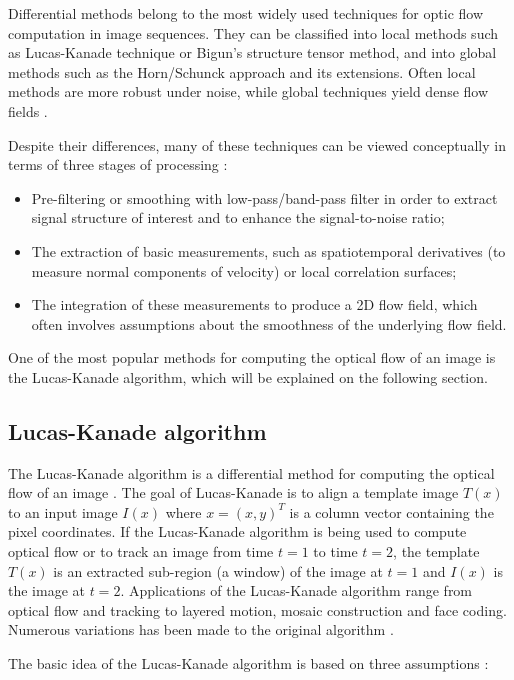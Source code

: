 \documentclass[msc, a4paper, classic, en]{ufbathesis}
\begin{document}
Differential methods belong to the most widely used techniques for optic flow computation in image sequences. They can be classified into local methods such as Lucas-Kanade technique or Bigun's structure tensor method, and into global methods such as the Horn/Schunck approach and its extensions. Often local methods are more robust under noise, while global techniques yield dense flow fields \cite{lkhs}.

Despite their differences, many of these techniques can be viewed conceptually in terms of three stages of processing \cite{opticalflow}:

\begin{itemize}
  \item Pre-filtering or smoothing with low-pass/band-pass filter in order to extract signal structure of interest and to enhance the signal-to-noise ratio;
  \item The extraction of basic measurements, such as spatiotemporal derivatives (to measure normal components of velocity) or local correlation surfaces;
  \item The integration of these measurements to produce a 2D flow field, which often involves assumptions about the smoothness of the underlying flow field.
\end{itemize}

One of the most popular methods for computing the optical flow of an image is the Lucas-Kanade algorithm, which will be explained on the following section.

\subsection{Lucas-Kanade algorithm}

The Lucas-Kanade \cite{lk} algorithm is a differential method for computing the optical flow of an image \cite{kinectkanade}. The goal of Lucas-Kanade is to align a template image $T(x)$ to an input image $I(x)$ where $x = (x, y)^T$ is a column vector containing the pixel coordinates. If the Lucas-Kanade algorithm is being used to compute optical flow or to track an image from time $t = 1$ to time $t = 2$, the template $T(x)$ is an extracted sub-region (a window) of the image at $t = 1$ and $I(x)$ is the image at $t = 2$. Applications of the Lucas-Kanade algorithm range from optical flow and tracking to layered motion, mosaic construction and face coding. Numerous variations has been made to the original algorithm \cite{lk20}.

The basic idea of the Lucas-Kanade algorithm is based on three assumptions \cite{bradski2008learning}:
\end{document}

